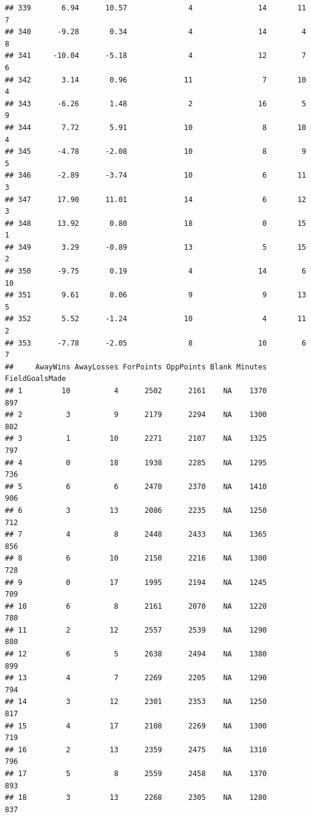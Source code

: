 \documentclass[]{book}
\begin{document}
\begin{verbatim}
## 339       6.94      10.57              4               14       11          7
## 340      -9.28       0.34              4               14        4          8
## 341     -10.04      -5.18              4               12        7          6
## 342       3.14       0.96             11                7       10          4
## 343      -6.26       1.48              2               16        5          9
## 344       7.72       5.91             10                8       10          4
## 345      -4.78      -2.08             10                8        9          5
## 346      -2.89      -3.74             10                6       11          3
## 347      17.90      11.01             14                6       12          3
## 348      13.92       0.80             18                0       15          1
## 349       3.29      -0.89             13                5       15          2
## 350      -9.75       0.19              4               14        6         10
## 351       9.61       8.06              9                9       13          5
## 352       5.52      -1.24             10                4       11          2
## 353      -7.78      -2.05              8               10        6          7
##     AwayWins AwayLosses ForPoints OppPoints Blank Minutes FieldGoalsMade
## 1         10          4      2502      2161    NA    1370            897
## 2          3          9      2179      2294    NA    1300            802
## 3          1         10      2271      2107    NA    1325            797
## 4          0         18      1938      2285    NA    1295            736
## 5          6          6      2470      2370    NA    1410            906
## 6          3         13      2086      2235    NA    1250            712
## 7          4          8      2448      2433    NA    1365            856
## 8          6         10      2150      2216    NA    1300            728
## 9          0         17      1995      2194    NA    1245            709
## 10         6          8      2161      2070    NA    1220            780
## 11         2         12      2557      2539    NA    1290            880
## 12         6          5      2638      2494    NA    1380            899
## 13         4          7      2269      2205    NA    1290            794
## 14         3         12      2301      2353    NA    1250            817
## 15         4         17      2108      2269    NA    1300            719
## 16         2         13      2359      2475    NA    1310            796
## 17         5          8      2559      2458    NA    1370            893
## 18         3         13      2268      2305    NA    1280            837

\end{verbatim}
\end{document}
